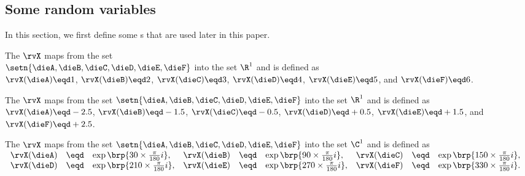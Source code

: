 \subsection{Some random variables}
In this section, we first define some s  
that are used later in this paper.
\begin{definition}
\label{def:rv_dietrad}
The  $\rvX$ maps from the set %
\\$\setn{\dieA,\dieB,\dieC,\dieD,\dieE,\dieF}$ into the set $\R^1$
and is defined as\footnotemark
\\\indentx
  $\rvX(\dieA)\eqd 1$, 
  $\rvX(\dieB)\eqd 2$, 
  $\rvX(\dieC)\eqd 3$, 
  $\rvX(\dieD)\eqd 4$, 
  $\rvX(\dieE)\eqd 5$, and 
  $\rvX(\dieF)\eqd 6$.
\end{definition}

\begin{definition}
\label{def:rv_diepam}
The  $\rvX$ maps from the set $\setn{\dieA,\dieB,\dieC,\dieD,\dieE,\dieF}$ into the set $\R^1$
and is defined as\footnotemark
\\\indentx
  $\rvX(\dieA)\eqd-2.5$, 
  $\rvX(\dieB)\eqd-1.5$, 
  $\rvX(\dieC)\eqd-0.5$, 
  $\rvX(\dieD)\eqd+0.5$, 
  $\rvX(\dieE)\eqd+1.5$, and 
  $\rvX(\dieF)\eqd+2.5$.
\end{definition}

\begin{definition}
\label{def:rv_dieqpsk}
The  $\rvX$ maps from the set $\setn{\dieA,\dieB,\dieC,\dieD,\dieE,\dieF}$ into the set $\C^1$
and is defined as\footnotemark 
\\\indentx$\begin{array}{rclrclrcl}
    \rvX(\dieA) &\eqd& \exp\brp{ 30\times\frac{\pi}{180}i}, 
   &\rvX(\dieB) &\eqd& \exp\brp{ 90\times\frac{\pi}{180}i}, 
   &\rvX(\dieC) &\eqd& \exp\brp{150\times\frac{\pi}{180}i}, 
  \\\rvX(\dieD) &\eqd& \exp\brp{210\times\frac{\pi}{180}i}, 
   &\rvX(\dieE) &\eqd& \exp\brp{270\times\frac{\pi}{180}i},
   &\rvX(\dieF) &\eqd& \exp\brp{330\times\frac{\pi}{180}i}.
\end{array}$
\end{definition}

